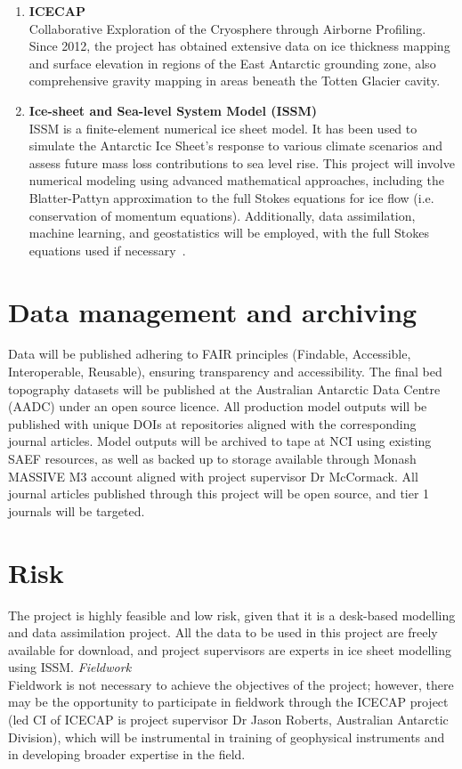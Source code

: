 \begin{enumerate}
    \item\textbf{ICECAP}\\ 
    Collaborative Exploration of the Cryosphere through Airborne Profiling. Since 2012, the project has obtained extensive data on ice thickness mapping and surface elevation in regions of the East Antarctic grounding zone, also comprehensive gravity mapping in areas beneath the Totten Glacier cavity\cite{ICECAP}.

    \item\textbf{Ice-sheet and Sea-level System Model (ISSM)}\\
    ISSM is a finite-element numerical ice sheet model. It has been used to simulate the Antarctic Ice Sheet’s response to various climate scenarios and assess future mass loss contributions to sea level rise\cite{Rydt_2013, Morlighem_2020}. This project will involve numerical modeling using advanced mathematical approaches, including the Blatter-Pattyn approximation to the full Stokes equations for ice flow (i.e. conservation of momentum equations). Additionally, data assimilation, machine learning, and geostatistics will be employed, with the full Stokes equations used if necessary~\cite{ISSM}.
\end{enumerate}

\section*{Data management and archiving}

Data will be published adhering to FAIR principles (Findable, Accessible, Interoperable, Reusable), ensuring transparency and accessibility. The final bed topography datasets will be published at the Australian Antarctic Data Centre (AADC) under an open source licence. All production model outputs will be published with unique DOIs at repositories aligned with the corresponding journal articles. Model outputs will be archived to tape at NCI using existing SAEF resources, as well as backed up to storage available through Monash MASSIVE M3 account aligned with project supervisor Dr McCormack. All journal articles published through this project will be open source, and tier 1 journals will be targeted.

\section*{Risk}

The project is highly feasible and low risk, given that it is a desk-based modelling and data assimilation project. All the data to be used in this project are freely available for download, and project supervisors are experts in ice sheet modelling using ISSM.
\vspace{0.6cm}
\textit{Fieldwork}\\
Fieldwork is not necessary to achieve the objectives of the project; however, there may be the opportunity to participate in fieldwork through the ICECAP project (led CI of ICECAP is project supervisor Dr Jason Roberts, Australian Antarctic Division), which will be instrumental in training of geophysical instruments and in developing broader expertise in the field. \\

